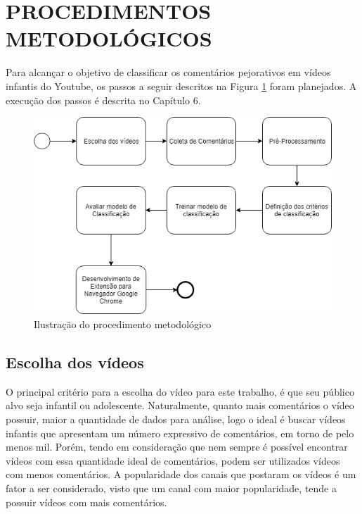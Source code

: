 \newpage
\section{PROCEDIMENTOS METODOLÓGICOS}

Para alcançar o objetivo de classificar os comentários pejorativos em vídeos infantis do Youtube, os passos a seguir descritos na Figura \ref{fig:metodologia} foram planejados. A execução dos passos é descrita no Capítulo 6.


\begin{figure}[H] %
	\caption{\label{fig:metodologia} Ilustração do procedimento metodológico}
	\begin{center}
	    \includegraphics[scale=0.7]{figuras/figura_6.png} %
	\end{center}
\end{figure}


\subsection{Escolha dos vídeos}
O principal critério para a escolha do vídeo para este trabalho, é que seu público alvo seja infantil ou adolescente. Naturalmente, quanto mais comentários o vídeo possuir, maior a quantidade de dados para análise, logo o ideal é buscar vídeos infantis que apresentam um número expressivo de comentários, em torno de pelo menos mil. Porém, tendo em consideração que nem sempre é possível encontrar vídeos com essa quantidade ideal de comentários, podem ser utilizados vídeos com menos comentários. A popularidade dos canais que postaram os vídeos é um fator a ser considerado, visto que um canal com maior popularidade, tende a possuir vídeos com mais comentários.


